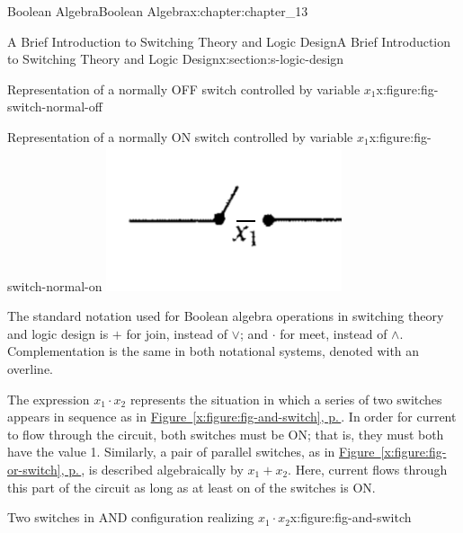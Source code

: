 \documentclass[twoside,10pt,]{book}
\newcommand{\xreffont}{\relax}
\numberwithin{equation}{section}
\begin{document}
\begin{chapterptx}{Boolean Algebra}{}{Boolean Algebra}{}{}{x:chapter:chapter_13}
\begin{sectionptx}{A Brief Introduction to Switching Theory and Logic Design}{}{A Brief Introduction to Switching Theory and Logic Design}{}{}{x:section:s-logic-design}
\begin{sidebyside}{2}{0}{0}{0}
\begin{sbspanel}{0.5}
\begin{figureptx}{Representation of a normally OFF switch controlled by variable \(x_1\)}{x:figure:fig-switch-normal-off}{}
\tcblower
\end{figureptx}%
\end{sbspanel}%
\begin{sbspanel}{0.5}%
\begin{figureptx}{Representation of a normally ON switch controlled by variable \(x_1\)}{x:figure:fig-switch-normal-on}{}%
\includegraphics[width=\linewidth]{images/fig-switch-normal-on.png}
\tcblower
\end{figureptx}%
\end{sbspanel}%
\end{sidebyside}%
\par
The standard notation used for Boolean algebra operations in switching theory and logic design is \(+\) for join, instead of \(\lor \); and \(\cdot \) for meet, instead of \(\land \). Complementation is the same in both notational systems, denoted with an overline.%
\par
The expression \(x_1 \cdot  x_2\) represents the situation in which a series of two switches appears in sequence as in \hyperref[x:figure:fig-and-switch]{Figure~{\xreffont\ref{x:figure:fig-and-switch}}, p.\,\pageref{x:figure:fig-and-switch}}. In order for current to flow through the circuit, both switches must be ON; that is, they must both have the value 1.  Similarly, a pair of parallel switches, as in \hyperref[x:figure:fig-or-switch]{Figure~{\xreffont\ref{x:figure:fig-or-switch}}, p.\,\pageref{x:figure:fig-or-switch}}, is described algebraically by \(x_1 + x_2\). Here, current flows through this part of the circuit as long as at least on of the switches is ON.%
\begin{sidebyside}{2}{0}{0}{0}%
\begin{sbspanel}{0.5}%
\begin{figureptx}{Two switches in AND configuration realizing \(x_1 \cdot x_2\)}{x:figure:fig-and-switch}{}%

\end{figureptx}
\end{sbspanel}
\end{sidebyside}
\end{sectionptx}
\end{chapterptx}
\end{document}
